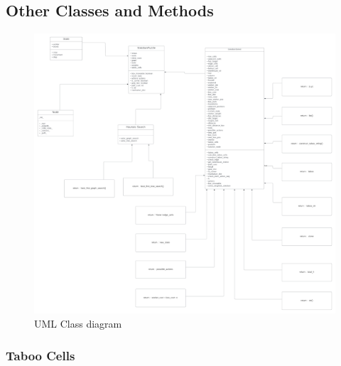 \documentclass[a4paper,12pt]{article}
\begin{document}
\subsection{Other Classes and Methods}

    \begin{figure}[H]
        \centering
        \includegraphics[width=18cm]{uml.png}
        \caption{UML Class diagram}
        \label{fig:svm_conf}
    \end{figure}
\subsubsection{Taboo Cells}
\end{document}
